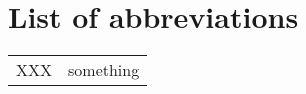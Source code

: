 \chapter*{List of abbreviations}

\begin{table}[htbp]
  \begin{center}
    \begin{tabu}{ll}

      XXX &	something \\

    \end{tabu}
  \end{center}
\end{table}

